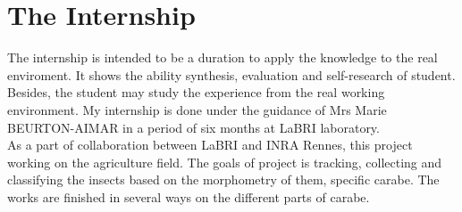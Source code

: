 \section{The Internship}
The internship is intended to be a duration to apply the knowledge to the real enviroment. It shows the ability synthesis, evaluation and self-research of student. Besides, the student may study the experience from the real working environment. My internship is done under the guidance of Mrs Marie BEURTON-AIMAR in a period of six months at LaBRI laboratory.\\[0.2cm]
As a part of collaboration between LaBRI and INRA Rennes, this project working on the agriculture field. The goals of project is tracking, collecting and classifying the insects based on the morphometry of them, specific carabe. The works are finished in several ways on the different parts of carabe. 
